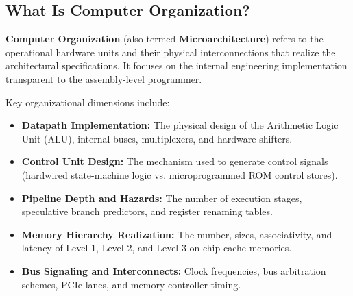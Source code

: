 \subsection{What Is Computer Organization?}
\textbf{Computer Organization} (also termed \textbf{Microarchitecture}) refers to the operational hardware units and their physical interconnections that realize the architectural specifications. It focuses on the internal engineering implementation transparent to the assembly-level programmer.

Key organizational dimensions include:
\begin{itemize}
    \item \textbf{Datapath Implementation:} The physical design of the Arithmetic Logic Unit (ALU), internal buses, multiplexers, and hardware shifters.
    \item \textbf{Control Unit Design:} The mechanism used to generate control signals (hardwired state-machine logic vs. microprogrammed ROM control stores).
    \item \textbf{Pipeline Depth and Hazards:} The number of execution stages, speculative branch predictors, and register renaming tables.
    \item \textbf{Memory Hierarchy Realization:} The number, sizes, associativity, and latency of Level-1, Level-2, and Level-3 on-chip cache memories.
    \item \textbf{Bus Signaling and Interconnects:} Clock frequencies, bus arbitration schemes, PCIe lanes, and memory controller timing.
\end{itemize}

